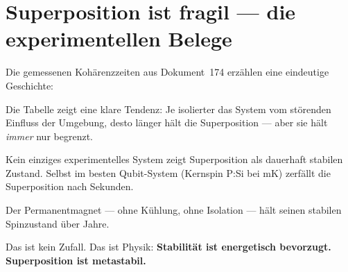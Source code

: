 \section{Superposition ist fragil --- die experimentellen Belege}
\label{sec:fragilitaet}

Die gemessenen Kohärenzzeiten aus Dokument~174
erzählen eine eindeutige Geschichte:

\begin{center}
\end{center}

Die Tabelle zeigt eine klare Tendenz:
Je isolierter das System vom störenden Einfluss der Umgebung,
desto länger hält die Superposition ---
aber sie hält \emph{immer} nur begrenzt.

\begin{keypoint}
Kein einziges experimentelles System zeigt
Superposition als dauerhaft stabilen Zustand.
Selbst im besten Qubit-System (Kernspin P:Si bei mK)
zerfällt die Superposition nach Sekunden.

Der Permanentmagnet --- ohne Kühlung, ohne Isolation ---
hält seinen stabilen Spinzustand über Jahre.

Das ist kein Zufall. Das ist Physik:
\textbf{Stabilität ist energetisch bevorzugt.
Superposition ist metastabil.}
\end{keypoint}

